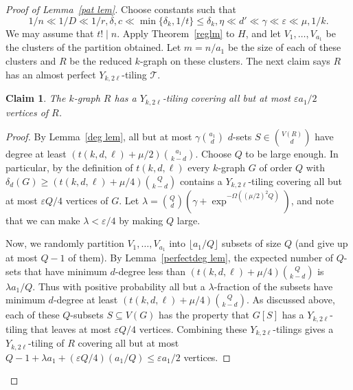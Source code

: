 \documentclass[11pt, reqno]{amsart}    	%
\newtheorem{claim}[thm]{Claim}
\theoremstyle{definition}
\numberwithin{equation}{section}
\begin{document}
	
	\begin{proof}[Proof of Lemma~\ref{pat lem}]
		Choose constants such that
		\[1/n\ll 1/D  \ll 1/r,\delta ,c  \ll \min\{\delta_{k},1/t \} \le \delta_{k},\eta \ll d' \ll \gamma  \ll \varepsilon \ll \mu,1/k.\]
		We may assume that $t!\mid n$. Apply Theorem~\ref{reglm} to $H$, and let
		$V_{1}, \dots,V_{a_{1}}$ be the clusters of the partition obtained. Let $m = n/a_{1}$ be the size of each of these clusters and $R$ be the reduced $k$-graph on these clusters. The next claim says $R$ has an almost  perfect  $Y_{k,2\ell}$-tiling $ \mathcal{T}$. 
		\begin{claim}
			The $k$-graph $R$ has a $Y_{k,2\ell}$-tiling covering all but at most
			$\varepsilon a_{1}/{2}$ vertices of $R$.
		\end{claim}
		\begin{proof}
			By Lemma~\ref{deg lem}, all but at most $\gamma \binom{a_{1}}{d}$ $d$-sets $S \in \binom{V(R)}{d}$ have degree at least $(t(k,d,\ell)+\mu/2) \binom{a_{1}}{k-d}$. Choose $Q$ to be large enough. 
			In particular, by the definition of $t(k,d,\ell)$ every $k$-graph $G$ of order $Q$ with $\delta_d(G)\ge(t(k, d, \ell)+\mu/4) \binom{Q}{k-d}$ contains a $Y_{k,2\ell}$-tiling covering all but at most $ \varepsilon Q/4 $ vertices of $ G $. Let $\lambda=\binom{Q}{d}(\gamma+\exp^{-\Omega((\mu/2)^{2}Q)})$, and note that we can make $\lambda < \varepsilon/4$ by making $Q$ large.
			
			Now, we randomly partition $V_{1}, \dots,V_{a_{1}}$ into $\lfloor a_1/Q\rfloor$ subsets of size $Q$ (and give up at most $Q-1$ of them). By Lemma~\ref{perfectdeg lem}, the expected number of $Q$-sets that have minimum $d$-degree less than $(t(k,d,\ell)+\mu/4)\binom{Q}{k-d}$ is $ \lambda a_1/Q$. Thus with positive probability all but a $\lambda$-fraction of the subsets have minimum $d$-degree at least $(t(k,d,\ell)+\mu/4)\binom{Q}{k-d}$. 
			As discussed above, each of these $Q$-subsets $S \subseteq V(G)$ has the property that $G[S]$ has a $Y_{k,2\ell}$-tiling that leaves at most $\varepsilon Q/4$ vertices. 
			Combining these $Y_{k,2\ell}$-tilings gives a  $Y_{k,2\ell}$-tiling of $R$ covering all but at most $Q-1+\lambda a_1+(\varepsilon Q/4) ( {a_1}/{Q})\le {\varepsilon a_{1}}/{2}$ vertices.
		\end{proof}
	

\end{proof}
\end{document}
